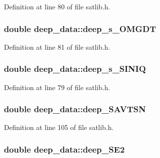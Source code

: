 Definition at line 80 of file satlib.\-h.

\hypertarget{structdeep__data_a8f25fa88406d398af7e3dc77f5756492}{
\subsubsection[{deep\-\_\-s\-\_\-\-O\-M\-G\-D\-T}]{\setlength{\rightskip}{0pt plus 5cm}double deep\-\_\-data\-::deep\-\_\-s\-\_\-\-O\-M\-G\-D\-T}}\label{structdeep__data_a8f25fa88406d398af7e3dc77f5756492}


Definition at line 81 of file satlib.\-h.

\hypertarget{structdeep__data_a5479a146e76ceeeb6b39b8e2dc86423a}{
\subsubsection[{deep\-\_\-s\-\_\-\-S\-I\-N\-I\-Q}]{\setlength{\rightskip}{0pt plus 5cm}double deep\-\_\-data\-::deep\-\_\-s\-\_\-\-S\-I\-N\-I\-Q}}\label{structdeep__data_a5479a146e76ceeeb6b39b8e2dc86423a}


Definition at line 79 of file satlib.\-h.

\hypertarget{structdeep__data_a5af5606eb1bc9ec16c675f2fcb423876}{
\subsubsection[{deep\-\_\-\-S\-A\-V\-T\-S\-N}]{\setlength{\rightskip}{0pt plus 5cm}double deep\-\_\-data\-::deep\-\_\-\-S\-A\-V\-T\-S\-N}}\label{structdeep__data_a5af5606eb1bc9ec16c675f2fcb423876}


Definition at line 105 of file satlib.\-h.

\hypertarget{structdeep__data_a9826bc9dbad9a08ab78bdde4226f62a4}{
\subsubsection[{deep\-\_\-\-S\-E2}]{\setlength{\rightskip}{0pt plus 5cm}double deep\-\_\-data\-::deep\-\_\-\-S\-E2}}\label{structdeep__data_a9826bc9dbad9a08ab78bdde4226f62a4}


